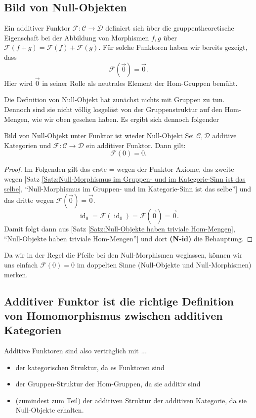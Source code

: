 \documentclass[a4paper]{amsart}
\theoremstyle{definition}
\newcommand{\myRef}[2]{[#1 \ref{#1:#2}, ``#2'']}
\DeclareMathOperator{\id}{id}
\newcommand{\CC}{\ensuremath{\mathcal{ C }}}
\newcommand{\DD}{\ensuremath{\mathcal{ D }}}
\newcommand{\FF}{\ensuremath{\mathcal{ F }}}
\begin{document}
\subsection{Bild von Null-Objekten}
Ein additiver Funktor $\FF \colon \CC \to \DD$ definiert sich über die gruppentheoretische Eigenschaft bei der Abbildung von Morphismen $f, g$ über $\FF( f+g ) = \FF(f) + \FF(g)$. Für solche Funktoren haben wir bereits gezeigt, dass
\begin{equation}
   \FF( \vec 0 ) = \vec 0.
\end{equation}
Hier wird $\vec 0$ in seiner Rolle als neutrales Element der Hom-Gruppen bemüht.

Die Definition von Null-Objekt hat zunächst nichts mit Gruppen zu tun. Dennoch sind sie nicht völlig losgelöst von der Gruppenstruktur auf den Hom-Mengen, wie wir oben gesehen haben. Es ergibt sich dennoch folgender
\begin{Satz}{Bild von Null-Objekt unter Funktor ist wieder Null-Objekt }
   Sei $\CC, \DD$ additive Kategorien und $\FF \colon \CC \to \DD$ ein additiver Funktor. Dann gilt:
   \begin{equation}
      \FF( 0 ) = 0.
   \end{equation}
\end{Satz}
\begin{proof}
   Im Folgenden gilt das erste = wegen der Funktor-Axiome, das zweite wegen \myRef{Satz}{Null-Morphismus im Gruppen- und im Kategorie-Sinn ist das selbe} und das dritte wegen $\FF( \vec 0 ) = \vec 0$.
   \begin{equation}
   \id_0 = \FF( \id_0 ) = \FF( \vec 0 ) = \vec 0.
   \end{equation}
   Damit folgt dann aus \myRef{Satz}{Null-Objekte haben triviale Hom-Mengen} und dort \textbf{(N-id)} die Behauptung.
\end{proof}

Da wir in der Regel die Pfeile bei den Null-Morphismen weglassen, können wir uns einfach $\FF( 0 ) = 0$ im doppelten Sinne (Null-Objekte und Null-Morphismen) merken.

\subsection{Additiver Funktor ist die richtige Definition von Homomorphismus zwischen additiven Kategorien}
Additive Funktoren sind also verträglich mit ...
\begin{itemize}
   \item der kategorischen Struktur, da es Funktoren sind
   \item der Gruppen-Struktur der Hom-Gruppen, da sie additiv sind
   \item (zumindest zum Teil) der additiven Struktur der additiven Kategorie, da sie Null-Objekte erhalten.
\end{itemize}
\end{document}
